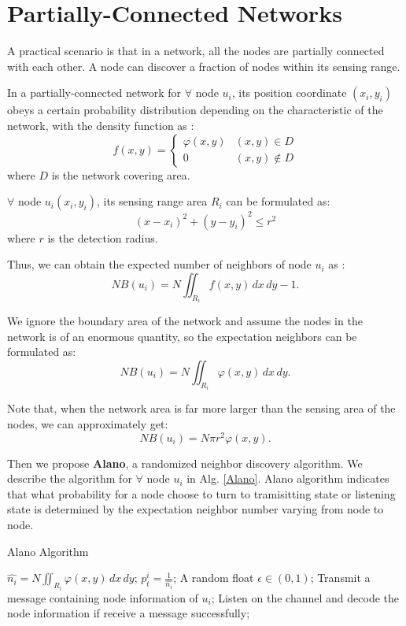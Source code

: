 \section{Partially-Connected Networks}
\label{PCN}



A practical scenario is that in a network,
all the nodes are partially connected with each other.
A node can discover a fraction of nodes within its sensing 
range.

In a partially-connected network for $\forall$ node $u_i$, 
its position coordinate $(x_i,y_i)$
obeys a certain probability distribution depending on the 
characteristic of the network, with the density function as :
$$f(x,y)=
\begin{cases}
\varphi(x,y)& (x,y)\in D\\
0& (x,y)\notin D
\end{cases}$$
where $D$ is the network covering area.

$\forall$ node $u_i (x_i,y_i)$, its sensing range area $R_i$ can be formulated as:
$$
(x-x_i)^2+(y-y_i)^2 \leq r^2
$$
where $r$ is the detection radius.

Thus, we can obtain the expected number of neighbors of node $u_i$ as :
$$
NB(u_i) = N\iint_{R_i} f(x,y)\,dx\,dy - 1.
$$

We ignore the boundary area of the network and assume the
nodes in the network is of an enormous quantity, so the 
expectation neighbors can be formulated as:
$$
NB(u_i) = N\iint_{R_i} \varphi(x,y)\,dx\,dy.
$$

Note that, when the network area is far more larger than the
sensing area of the nodes, we can approximately get:
$$
NB(u_i) = N\pi r^2 \varphi(x,y).
$$




Then we propose \textbf{Alano}, a randomized neighbor discovery algorithm. 
We describe the algorithm for $\forall$ node $u_i$ in Alg. \ref{Alano}.
Alano algorithm indicates that what probability for a node choose to turn to  
tramisitting state or listening state is determined
by the expectation neighbor number varying from node to node.


\begin{algorithm}
\caption{Alano Algorithm}
\label{Alano}
\begin{algorithmic}[1]
\STATE $\hat{n_i} = N\iint_{R_i} \varphi(x,y)\,dx\,dy$;
\STATE $p_t^i = \frac{1}{\hat{n_i}}$;
	\STATE A random float $\epsilon \in (0,1)$;
    		\STATE Transmit a message containing node information of $u_i$;
	\ELSE
    		\STATE Listen on the channel and decode the node information if receive a message successfully;
	\ENDIF
\ENDWHILE
\end{algorithmic}
\end{algorithm}

